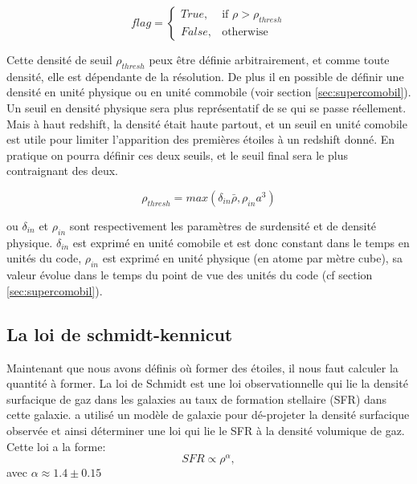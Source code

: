\begin{equation}
	flag = 
  \begin{cases}
      True, & \text{if } \rho > \rho_{thresh}\\
      False,              & \text{otherwise}
  \end{cases}
\end{equation} 

Cette densité de seuil $\rho_{thresh}$ peux être définie arbitrairement, et comme toute densité, elle est dépendante de la résolution.
De plus il en possible de définir une densité en unité physique ou en unité commobile (voir section \ref{sec:supercomobil}).
Un seuil en densité physique sera plus représentatif de se qui se passe réellement.
Mais à haut redshift, la densité était haute partout, et un seuil en unité comobile est utile pour limiter l'apparition des premières étoiles à un redshift donné.
En pratique on pourra définir ces deux seuils, et le seuil final sera le plus contraignant des deux.


\begin{equation}
	\rho_{thresh} = max\left(  \delta_{in} \bar{\rho}, \rho_{in} a^3 \right)
\end{equation} 

ou $\delta_{in}$ et $\rho_{in}$  sont respectivement les paramètres de surdensité et de densité physique.
$\delta_{in}$ est exprimé en unité comobile et est donc constant dans le temps en unités du code,
 $\rho_{in}$ est exprimé en unité physique (en atome par mètre cube), sa valeur évolue dans le temps du point de vue des unités du code (cf section \ref{sec:supercomobil}).


\subsection{La loi de schmidt-kennicut}
\label{sec:schmidt-kennicut}

Maintenant que nous avons définis où former des étoiles, il nous faut calculer la quantité à former.
La loi de Schmidt \citep{1959ApJ...129..243S}  est une loi observationnelle qui lie la densité surfacique de gaz dans les galaxies au taux de formation stellaire (\ac{SFR}) dans cette galaxie.
\cite{1998ApJ...498..541K} a utilisé un modèle de galaxie pour dé-projeter la densité surfacique observée et ainsi déterminer une loi qui lie le \ac{SFR} à la densité volumique de gaz.
Cette loi a la forme:
\begin{equation}
SFR \propto \rho ^{\alpha},
\end{equation}
avec $\alpha \approx 1.4 \pm 0.15$

